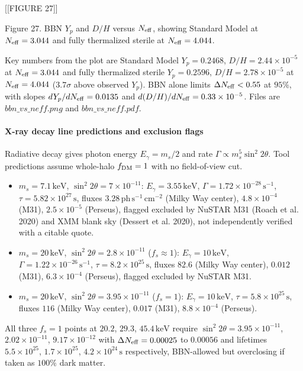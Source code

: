 \documentclass[11pt,a4paper]{article}
\begin{document}
[[FIGURE 27]]

Figure 27. BBN $Y_p$ and $D/H$ versus $N_{\rm eff}$, showing Standard Model at $N_{\rm eff}=3.044$ and fully thermalized sterile at $N_{\rm eff}=4.044$.

Key numbers from the plot are Standard Model $Y_p = 0.2468$, $D/H = 2.44\times10^{-5}$ at $N_{\rm eff} = 3.044$ and fully thermalized sterile $Y_p = 0.2596$, $D/H = 2.78\times10^{-5}$ at $N_{\rm eff} = 4.044$ ($3.7\sigma$ above observed $Y_p$). BBN alone limits $\Delta N_{\rm eff} < 0.55$ at $95\%$, with slopes $dY_p/dN_{\rm eff} = 0.0135$ and $d(D/H)/dN_{\rm eff} = 0.33\times10^{-5}$. Files are $bbn\_vs\_neff.png$ and $bbn\_vs\_neff.pdf$.

\paragraph{X-ray decay line predictions and exclusion flags}
Radiative decay gives photon energy $E_\gamma = m_s/2$ and rate $\Gamma \propto m_s^5 \sin^2 2\theta$. Tool predictions assume whole-halo $f_{\rm DM}=1$ with no field-of-view cut.

\begin{itemize}
  \item $m_s = 7.1\,\mathrm{keV}$, $\sin^2 2\theta = 7\times10^{-11}$: $E_\gamma = 3.55\,\mathrm{keV}$, $\Gamma = 1.72\times10^{-28}\,\mathrm{s}^{-1}$, $\tau = 5.82\times10^{27}\,\mathrm{s}$, fluxes $3.28\,\mathrm{ph\,s^{-1}\,cm^{-2}}$ (Milky Way center), $4.8\times10^{-4}$ (M31), $2.5\times10^{-5}$ (Perseus), flagged excluded by NuSTAR M31 (Roach et al. 2020) and XMM blank sky (Dessert et al. 2020), not independently verified with a citable quote.
  \item $m_s = 20\,\mathrm{keV}$, $\sin^2 2\theta = 2.8\times10^{-11}$ ($f_s \approx 1$): $E_\gamma = 10\,\mathrm{keV}$, $\Gamma = 1.22\times10^{-26}\,\mathrm{s}^{-1}$, $\tau = 8.2\times10^{25}\,\mathrm{s}$, fluxes $82.6$ (Milky Way center), $0.012$ (M31), $6.3\times10^{-4}$ (Perseus), flagged excluded by NuSTAR M31.
  \item $m_s = 20\,\mathrm{keV}$, $\sin^2 2\theta = 3.95\times10^{-11}$ ($f_s=1$): $E_\gamma = 10\,\mathrm{keV}$, $\tau = 5.8\times10^{25}\,\mathrm{s}$, fluxes $116$ (Milky Way center), $0.017$ (M31), $8.8\times10^{-4}$ (Perseus).
\end{itemize}
All three $f_s=1$ points at $20.2$, $29.3$, $45.4\,\mathrm{keV}$ require $\sin^2 2\theta = 3.95\times10^{-11}$, $2.02\times10^{-11}$, $9.17\times10^{-12}$ with $\Delta N_{\rm eff} = 0.00025$ to $0.00056$ and lifetimes $5.5\times10^{25}$, $1.7\times10^{25}$, $4.2\times10^{24}\,\mathrm{s}$ respectively, BBN-allowed but overclosing if taken as $100\%$ dark matter.
\end{document}
